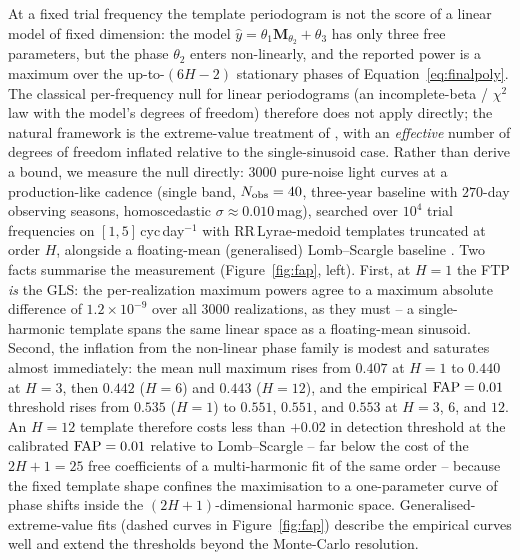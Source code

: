 \documentclass[apj]{emulateapj}
\newcommand{\Mshft}{\mathbf{M}_{\theta_2}}
\begin{document}
At a fixed trial frequency the template periodogram is not the score of a
linear model of fixed dimension: the model
$\hat{y} = \theta_1\Mshft + \theta_3$ has only three free parameters, but the
phase $\theta_2$ enters non-linearly, and the reported power is a maximum over
the up-to-$(6H{-}2)$ stationary phases of Equation~\ref{eq:finalpoly}.  The
classical per-frequency null for linear periodograms (an incomplete-beta /
$\chi^2$ law with the model's degrees of freedom) therefore does not apply
directly; the natural framework is the extreme-value treatment of
\cite{Baluev_2008}, with an \emph{effective} number of degrees of freedom
inflated relative to the single-sinusoid case.  Rather than derive a bound,
we measure the null directly: $3000$ pure-noise light curves at a
production-like cadence (single band, $N_{\rm obs}=40$, three-year baseline
with $270$-day observing seasons, homoscedastic $\sigma \approx 0.010$\,mag),
searched over $10^4$ trial frequencies on $[1,5]$\,cyc\,day$^{-1}$ with
RR\,Lyrae-medoid templates truncated at order $H$, alongside a floating-mean
(generalised) Lomb--Scargle baseline \citep[GLS;][]{Zechmeister+Kurster_2009}.
Two facts summarise the measurement (Figure~\ref{fig:fap}, left).  First, at
$H=1$ the FTP \emph{is} the GLS: the per-realization maximum powers agree to
a maximum absolute difference of $1.2\times10^{-9}$ over all $3000$
realizations, as they must -- a single-harmonic template spans the same
linear space as a floating-mean sinusoid.  Second, the inflation from
the non-linear phase family is modest and saturates almost immediately: the
mean null maximum rises from $0.407$ at $H=1$ to $0.440$ at $H=3$, then
$0.442$ ($H=6$) and $0.443$ ($H=12$), and the empirical ${\rm FAP}=0.01$
threshold rises from $0.535$ ($H=1$) to $0.551$, $0.551$, and $0.553$ at
$H=3$, $6$, and $12$.  An $H=12$ template therefore costs less than $+0.02$
in detection threshold at the calibrated ${\rm FAP}=0.01$ relative to
Lomb--Scargle -- far below the cost of the $2H{+}1 = 25$ free coefficients
of a multi-harmonic fit of the same order -- because the fixed template
shape confines the maximisation to a one-parameter curve of phase shifts
inside the $(2H{+}1)$-dimensional harmonic space.
Generalised-extreme-value fits (dashed curves in Figure~\ref{fig:fap})
describe the empirical curves well and extend the thresholds beyond the
Monte-Carlo resolution.
\end{document}
